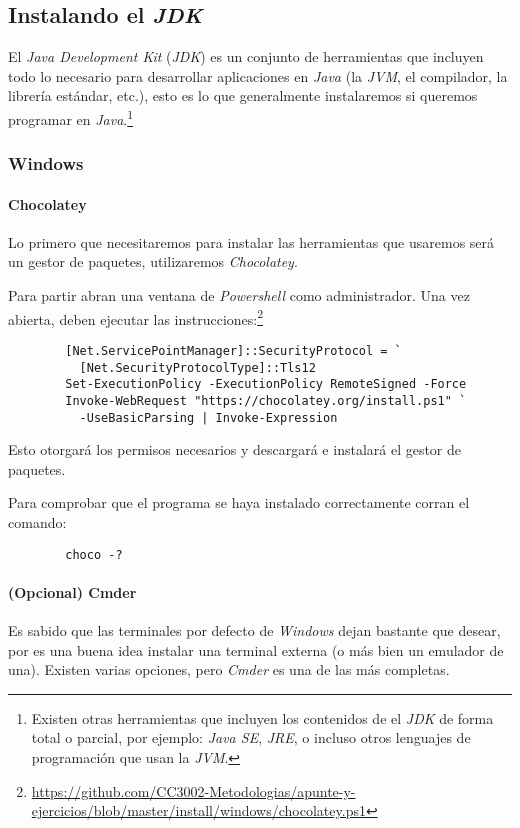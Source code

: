 \subsection{Instalando el \textit{JDK}}
  El \textit{Java Development Kit} (\textit{JDK}) es un conjunto de herramientas que incluyen 
  todo lo necesario para desarrollar aplicaciones en \textit{Java} (la \textit{JVM}, el 
  compilador, la librería estándar, etc.), esto es lo que generalmente instalaremos si queremos
  programar en \textit{Java}.\footnote{Existen otras herramientas que incluyen los contenidos de 
  el \textit{JDK} de forma total o parcial, por ejemplo: \textit{Java SE}, \textit{JRE}, o 
  incluso otros lenguajes de programación que usan la \textit{JVM}.}

  \subsubsection{Windows}
    \paragraph{Chocolatey}
      Lo primero que necesitaremos para instalar las herramientas que usaremos será un gestor de 
      paquetes, utilizaremos \textit{Chocolatey}.\autocite{choco}

      Para partir abran una ventana de \textit{Powershell} como administrador.
      Una vez abierta, deben ejecutar las instrucciones:\footnote{
        \url{https://github.com/CC3002-Metodologias/apunte-y-ejercicios/blob/master/install/windows/chocolatey.ps1}
      }
      \begin{verbatim}
        [Net.ServicePointManager]::SecurityProtocol = `
          [Net.SecurityProtocolType]::Tls12
        Set-ExecutionPolicy -ExecutionPolicy RemoteSigned -Force
        Invoke-WebRequest "https://chocolatey.org/install.ps1" `
          -UseBasicParsing | Invoke-Expression
      \end{verbatim}

      Esto otorgará los permisos necesarios y descargará e instalará el gestor de paquetes.

      Para comprobar que el programa se haya instalado correctamente corran el comando:
      \begin{verbatim}
        choco -?
      \end{verbatim}
      
    \paragraph{(Opcional) Cmder}
      Es sabido que las terminales por defecto de \textit{Windows} dejan bastante que desear, 
      por es una buena idea instalar una terminal externa (o más bien un emulador de una).
      Existen varias opciones, pero \textit{Cmder} es una de las más completas.